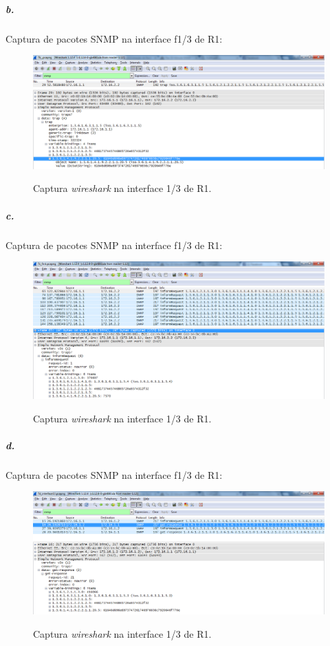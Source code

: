 \newpage

\subparagraph{b.}
Captura de pacotes SNMP na interface \textsf{f1/3} de \textsf{R1}:

\begin{figure}[h]
\centering
\includegraphics[width=1\textwidth, height=0.3\textheight]{7b.png}
\label{fig:11-capturaWireshark}
\caption{Captura \emph{wireshark} na interface \textsf{1/3} de \textsf{R1}.}
\end{figure}

\newpage

\subparagraph{c.}
Captura de pacotes SNMP na interface \textsf{f1/3} de \textsf{R1}:

\begin{figure}[h]
\centering
\includegraphics[width=1\textwidth, height=0.33\textheight]{7c.png}
\label{fig:12-capturaWireshark}
\caption{Captura \emph{wireshark} na interface \textsf{1/3} de \textsf{R1}.}
\end{figure}


\subparagraph{d.}
Captura de pacotes SNMP na interface \textsf{f1/3} de \textsf{R1}:

\begin{figure}[h]
\centering
\includegraphics[width=1\textwidth, height=0.3\textheight]{7d.png}
\label{fig:13-capturaWireshark}
\caption{Captura \emph{wireshark} na interface \textsf{1/3} de \textsf{R1}.}
\end{figure}


